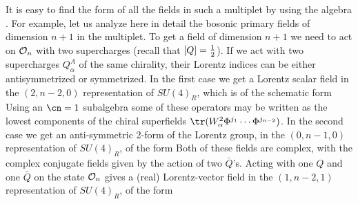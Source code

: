 It is easy to find the form of all the fields in such a multiplet by
using the algebra .  For example, let us analyze here
in detail the bosonic primary fields of dimension $n+1$ in the multiplet. To
get a field of dimension $n+1$ we need to act on ${\cal O}_n$ with two
supercharges (recall that $[Q]={1\over 2}$).  If we act with two
supercharges $Q_{\alpha}^A$ of the same chirality, their Lorentz
indices can be either antisymmetrized or symmetrized.
In the first case we get a Lorentz scalar field in the
$(2,n-2,0)$ representation of $SU(4)_R$, which is of the schematic
form 
Using an $\cn=1$ subalgebra some of these operators may be written as
the lowest components of the chiral superfields $\tr(W_{\alpha}^2
\Phi^{j_1} \cdots \Phi^{j_{n-2}})$. In the second case we get an
anti-symmetric 2-form of the Lorentz group, in the $(0,n-1,0)$
representation of $SU(4)_R$, of the form 
Both of these fields are complex, with the complex
conjugate fields given by the action of two ${\bar Q}$'s. Acting with
one $Q$ and one ${\bar Q}$ on the state ${\cal O}_n$ gives a (real)
Lorentz-vector field in the $(1,n-2,1)$ representation of $SU(4)_R$,
of the form 

